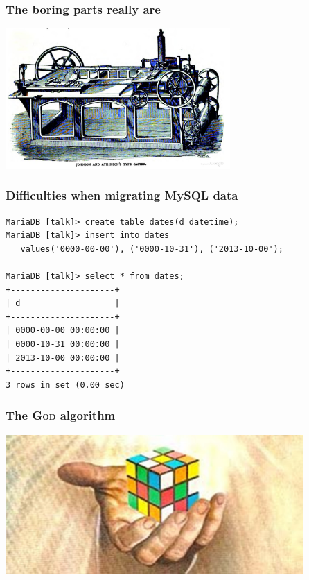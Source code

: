 \documentclass{beamer}
\begin{document}
\begin{frame}
  \frametitle{The boring parts really are}

  
  \begin{center}
    \includegraphics[height=2.1in]{type-casting-machine.jpg}
  \end{center}
\end{frame}

\begin{frame}[fragile]
  \frametitle{Difficulties when migrating MySQL data}
  
  \vfill

\begin{verbatim}
MariaDB [talk]> create table dates(d datetime);
MariaDB [talk]> insert into dates
   values('0000-00-00'), ('0000-10-31'), ('2013-10-00');

MariaDB [talk]> select * from dates;
+---------------------+
| d                   |
+---------------------+
| 0000-00-00 00:00:00 |
| 0000-10-31 00:00:00 |
| 2013-10-00 00:00:00 |
+---------------------+
3 rows in set (0.00 sec)
\end{verbatim}
\end{frame}

\begin{frame}[fragile]
  \frametitle{The \textsc{God} algorithm}

  \begin{center}
    \includegraphics[height=2.1in]{god-has-spoken-algorithm-reveals-secret-number-for-rubiks-cube.jpg}
  \end{center}
\end{frame}
\end{document}
